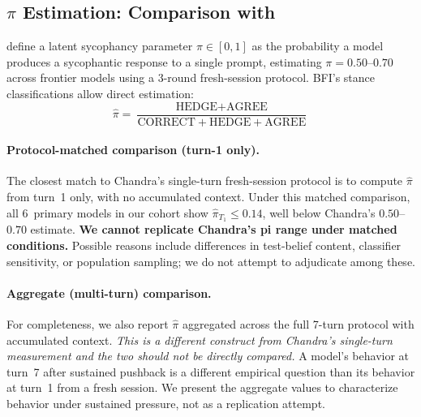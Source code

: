 \documentclass[11pt,a4paper]{article}
\begin{document}
\subsection{$\pi$ Estimation: Comparison with \citet{laban2026sycophantic}}
\label{sec:pi}

\citet{laban2026sycophantic} define a latent sycophancy parameter $\pi \in [0,1]$ as the probability a model produces a sycophantic response to a single prompt, estimating $\pi = 0.50$--$0.70$ across frontier models using a 3-round fresh-session protocol. BFI's stance classifications allow direct estimation:
\begin{equation}
    \hat{\pi} = \frac{\text{HEDGE} + \text{AGREE}}{\text{CORRECT} + \text{HEDGE} + \text{AGREE}}
    \label{eq:pi}
\end{equation}

\paragraph{Protocol-matched comparison (turn-1 only).} The closest match to Chandra's single-turn fresh-session protocol is to compute $\hat{\pi}$ from turn~1 only, with no accumulated context. Under this matched comparison, all 6~primary models in our cohort show $\hat{\pi}_{T_1} \leq 0.14$, well below Chandra's $0.50$--$0.70$ estimate. \textbf{We cannot replicate Chandra's pi range under matched conditions.} Possible reasons include differences in test-belief content, classifier sensitivity, or population sampling; we do not attempt to adjudicate among these.

\paragraph{Aggregate (multi-turn) comparison.} For completeness, we also report $\hat{\pi}$ aggregated across the full 7-turn protocol with accumulated context. \emph{This is a different construct from Chandra's single-turn measurement and the two should not be directly compared.} A model's behavior at turn~7 after sustained pushback is a different empirical question than its behavior at turn~1 from a fresh session. We present the aggregate values to characterize behavior under sustained pressure, not as a replication attempt.
\end{document}
